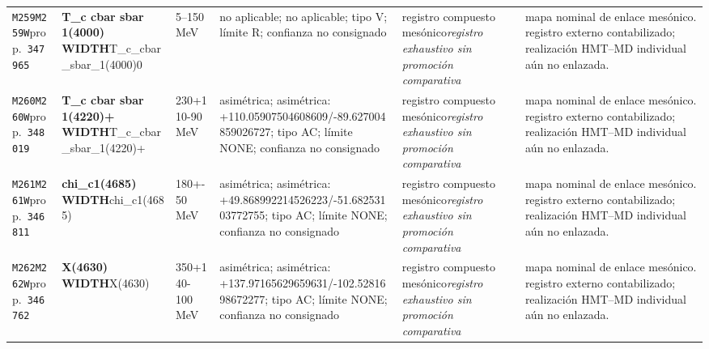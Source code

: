 \begin{landscape}
\begin{longtable}{L{1.85cm}L{4.45cm}L{2.35cm}L{4.05cm}L{3.35cm}L{7.15cm}}
\texttt{M259}\newline \texttt{M259W}\newline prop.\ \texttt{347965} & \textbf{T\_\allowbreak{}c cbar sbar 1(4000) WIDTH}\newline T\_\allowbreak{}c\_\allowbreak{}cbar\_\allowbreak{}sbar\_\allowbreak{}1(4000)0 & 5--150\,MeV & no aplicable; no aplicable; tipo V; límite R; confianza no consignado & registro compuesto mesónico\newline \emph{registro exhaustivo sin promoción comparativa} & mapa nominal de enlace mesónico. registro externo contabilizado; realización HMT--MD individual aún no enlazada. \\
\texttt{M260}\newline \texttt{M260W}\newline prop.\ \texttt{348019} & \textbf{T\_\allowbreak{}c cbar sbar 1(4220)+ WIDTH}\newline T\_\allowbreak{}c\_\allowbreak{}cbar\_\allowbreak{}sbar\_\allowbreak{}1(4220)+ & 230+110-90\,MeV & asimétrica; asimétrica: +110.05907504608609/-89.627004859026727; tipo AC; límite NONE; confianza no consignado & registro compuesto mesónico\newline \emph{registro exhaustivo sin promoción comparativa} & mapa nominal de enlace mesónico. registro externo contabilizado; realización HMT--MD individual aún no enlazada. \\
\texttt{M261}\newline \texttt{M261W}\newline prop.\ \texttt{346811} & \textbf{chi\_\allowbreak{}c1(4685) WIDTH}\newline chi\_\allowbreak{}c1(4685) & 180+-50\,MeV & asimétrica; asimétrica: +49.868992214526223/-51.68253103772755; tipo AC; límite NONE; confianza no consignado & registro compuesto mesónico\newline \emph{registro exhaustivo sin promoción comparativa} & mapa nominal de enlace mesónico. registro externo contabilizado; realización HMT--MD individual aún no enlazada. \\
\texttt{M262}\newline \texttt{M262W}\newline prop.\ \texttt{346762} & \textbf{X(4630) WIDTH}\newline X(4630) & 350+140-100\,MeV & asimétrica; asimétrica: +137.97165629659631/-102.5281698672277; tipo AC; límite NONE; confianza no consignado & registro compuesto mesónico\newline \emph{registro exhaustivo sin promoción comparativa} & mapa nominal de enlace mesónico. registro externo contabilizado; realización HMT--MD individual aún no enlazada. \\

\end{longtable}
\end{landscape}
